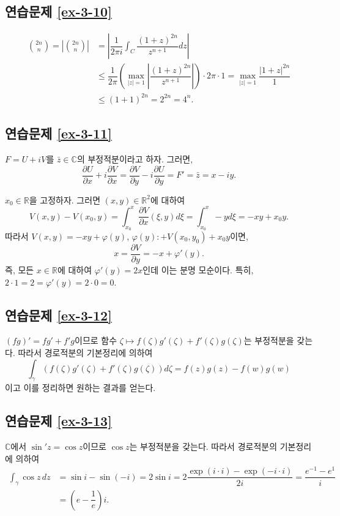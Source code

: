 \subsection*{연습문제 \ref{ex-3-10}}

\begin{align*}
{2n \choose n} = \left|  {2n \choose n} \right|
&= \left| \dfrac1{2\pi i}\int_C \dfrac{(1+z)^{2n}}{z^{n+1}}dz \right| \\
&\le \dfrac1{2\pi} \left( \max_{|z|=1} \left| \dfrac{(1+z)^{2n}}{z^{n+1}}\right| \right)
\cdot 2\pi\cdot 1 = \max_{|z|=1} \dfrac{|1+z|^{2n}}1 \\
&\le (1+1)^{2n} = 2^{2n} = 4^n.
\end{align*}

\subsection*{연습문제 \ref{ex-3-11}}

$F=U+iV$를 $\bar z \in \mathbb C$의 부정적분이라고 하자.
그러면,
\[
\dfrac{\partial U}{\partial x}  + i \dfrac{\partial V}{\partial x}
= \dfrac{\partial V}{\partial y} - i\dfrac{\partial U}{\partial y}
= F' = \bar z = x-iy.
\]

$x_0\in\mathbb R$을 고정하자. 그러면 $(x,y)\in\mathbb R^2$에 대하여
\[
V(x,y ) - V(x_0, y) = \int_{x_0}^x \dfrac{\partial V}{\partial x}(\xi, y )d\xi
= \int_{x_0}^x -y d\xi = -xy +x_0y.
\]
따라서 $V(x,y) = -xy + \varphi(y)$, $\varphi(y):+V(x_0,y_0) + x_0y$이면,
\[
x  = \dfrac{\partial V}{\partial y} = -x + \varphi'(y).
\]
즉, 모든 $x\in\mathbb R$에 대하여 $\varphi'(y) = 2x$인데
이는 분명 모순이다.
특히, $2\cdot 1 = 2 = \varphi'(y) = 2\cdot  0 = 0$.

\subsection*{연습문제 \ref{ex-3-12}}

$(fg)' = fg' + f'g$이므로
함수 $\zeta \mapsto f(\zeta)g'(\zeta) + f'(\zeta)g(\zeta)$는 
부정적분을 갖는다.
따라서 경로적분의 기본정리에 의하여
\[
\int_\gamma \left( f(\zeta)g'(\zeta) + f'(\zeta)g(\zeta) \right) d\zeta
= f(z)g(z) - f(w)g(w)
\]
이고 이를 정리하면 원하는 결과를 얻는다.

\subsection*{연습문제 \ref{ex-3-13}}

$\mathbb C$에서 $\sin' z = \cos z$이므로 $\cos z$는 부정적분을 갖는다.
따라서 경로적분의 기본정리에 의하여
\begin{align*}
\int_\gamma \cos z \, dz 
&= \sin i - \sin (-i) = 2\sin i = 2\dfrac{\exp(i\cdot i) - \exp(-i\cdot i)}{2i}
= \dfrac{e^{-1} - e^{1}}i \\
&= \left( e - \dfrac1e \right)i.
\end{align*}


